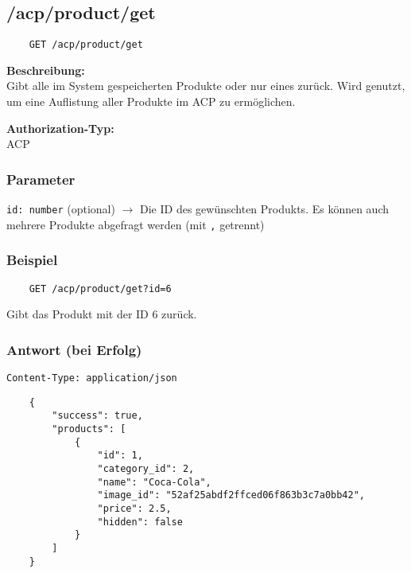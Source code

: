 \subsection{/acp/product/get}

\begin{lstlisting}
    GET /acp/product/get
\end{lstlisting}

\textbf{Beschreibung:} \\
Gibt alle im System gespeicherten Produkte oder nur eines zurück. Wird genutzt, um eine Auflistung aller Produkte im ACP zu ermöglichen.

\textbf{Authorization-Typ:} \\
ACP

\subsubsection{Parameter}

\lstinline{id: number} (optional)
$\rightarrow$ Die ID des gewünschten Produkts. Es können auch mehrere Produkte abgefragt werden (mit \lstinline{,} getrennt)

\subsubsection{Beispiel}

\begin{lstlisting}
    GET /acp/product/get?id=6
\end{lstlisting}

Gibt das Produkt mit der ID 6 zurück.

\subsubsection{Antwort (bei Erfolg)}

\lstinline{Content-Type: application/json}
\begin{lstlisting}
    {
        "success": true, 
        "products": [
            {
                "id": 1,
                "category_id": 2,
                "name": "Coca-Cola",
                "image_id": "52af25abdf2ffced06f863b3c7a0bb42",
                "price": 2.5,
                "hidden": false
            }
        ]
    }
\end{lstlisting}
